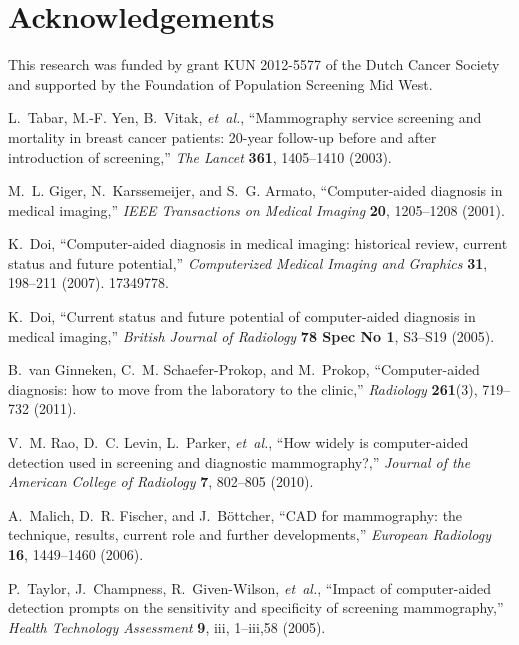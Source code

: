 \documentclass[12pt]{spieman}  %
\begin{document}
\section*{Acknowledgements}
This research was funded by grant KUN 2012-5577 of the Dutch Cancer Society and supported by the Foundation of Population Screening Mid West.

% 

\begin{thebibliography}{10}

L.~Tabar, M.-F. Yen, B.~Vitak, {\em et~al.}, ``Mammography service screening
  and mortality in breast cancer patients: 20-year follow-up before and after
  introduction of screening,'' {\em The Lancet} {\bf 361}, 1405--1410  (2003).

M.~L. Giger, N.~Karssemeijer, and S.~G. Armato, ``Computer-aided diagnosis in
  medical imaging,'' {\em IEEE Transactions on Medical Imaging} {\bf 20},
  1205--1208  (2001).

K.~Doi, ``Computer-aided diagnosis in medical imaging: historical review,
  current status and future potential,'' {\em Computerized Medical Imaging and
  Graphics} {\bf 31}, 198--211  (2007).
 17349778.

K.~Doi, ``Current status and future potential of computer-aided diagnosis in
  medical imaging,'' {\em British Journal of Radiology} {\bf 78 Spec No 1},
  S3--S19  (2005).

B.~van Ginneken, C.~M. Schaefer-Prokop, and M.~Prokop, ``Computer-aided
  diagnosis: how to move from the laboratory to the clinic,'' {\em Radiology}
  {\bf 261}(3), 719--732  (2011).

V.~M. Rao, D.~C. Levin, L.~Parker, {\em et~al.}, ``How widely is computer-aided
  detection used in screening and diagnostic mammography?,'' {\em Journal of
  the American College of Radiology} {\bf 7}, 802--805  (2010).

A.~Malich, D.~R. Fischer, and J.~B\"ottcher, ``{CAD} for mammography: the
  technique, results, current role and further developments,'' {\em European
  Radiology} {\bf 16}, 1449--1460  (2006).

P.~Taylor, J.~Champness, R.~Given-Wilson, {\em et~al.}, ``Impact of
  computer-aided detection prompts on the sensitivity and specificity of
  screening mammography,'' {\em Health Technology Assessment} {\bf 9}, iii,
  1--iii,58  (2005).


\end{thebibliography}
\end{document}
